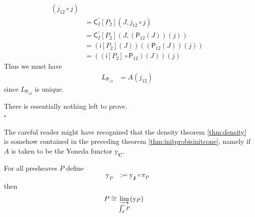 \begin{cst}
\begin{align*}
  \left(
    j_{12}
    \circ
    j
  \right)
  \\
  &=
  \mathsf{C}_{I}^{\prime}[P_{2}]
  \left(
    J,
    j_{12}
    \circ
    j
  \right)
  \\
  &=
  \mathsf{C}_{I}^{\prime}[P_{2}]
  \left(
    J,
    \left(
      \mathsf{P}_{12}(J)
    \right)
    (j)
  \right)
  \\
  &=
  \left(
    \mathsf{i}[P_{2}](J)
  \right)
  \left(
    \left(
      \mathsf{P}_{12}(J)
    \right)
    (j)
  \right)
  \\
  &=
  \left(
    \left(
      \mathsf{i}[P_{2}]
      \circ
      \mathsf{P}_{12}
    \right)
    (J)
  \right)
  (j)
\end{align*}
Thus we must have
\begin{align*}
  L_{\mathsf{P}_{12}}
  &=
  A(j_{12})
\end{align*}
since $L_{\mathsf{P}_{12}}$ is unique.
\end{cst}
\begin{prf}
There is essentially nothing left to prove.
\\
\phantom{proven}
\hfill
$\square$
\end{prf}
The careful reader might have recognized that the density theorem \ref{thm:density} is somehow contained in the preceding theorem \ref{thm:initprobisinitcone}, namely if $A$ is taken to be the Yoneda functor $\mathrm{y}_{\mathbf{C}}$.
\\
\begin{cor}[density]
\label{cor:density}
For all presheaves $P$ define
\begin{align*}
  \mathrm{y}_{P}
  &:=
  \mathrm{y}_{\mathbf{J}}
  \circ
  \pi_{P}
\end{align*}
then
\begin{align*}
  P
  &\cong
  \varinjlim_{\int_{\mathbf{J}}^{\prime}P}(\mathrm{y}_{P})
\end{align*}
\end{cor}
